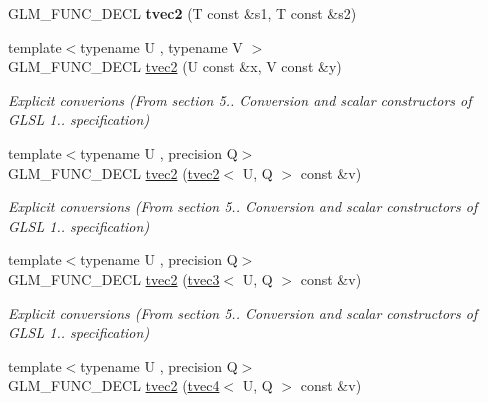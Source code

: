 \begin{DoxyCompactItemize}
\item 
G\+L\+M\+\_\+\+F\+U\+N\+C\+\_\+\+D\+E\+CL {\bfseries tvec2} (T const \&s1, T const \&s2)\hypertarget{structglm_1_1detail_1_1tvec2_a1c01dd00c55f77aae7bbb7e33ca85c54}{}\label{structglm_1_1detail_1_1tvec2_a1c01dd00c55f77aae7bbb7e33ca85c54}

\item 
{\footnotesize template$<$typename U , typename V $>$ }\\G\+L\+M\+\_\+\+F\+U\+N\+C\+\_\+\+D\+E\+CL \hyperlink{structglm_1_1detail_1_1tvec2_a7521b4e5e4260e7e53f936b01b18e3c7}{tvec2} (U const \&x, V const \&y)\hypertarget{structglm_1_1detail_1_1tvec2_a7521b4e5e4260e7e53f936b01b18e3c7}{}\label{structglm_1_1detail_1_1tvec2_a7521b4e5e4260e7e53f936b01b18e3c7}

\begin{DoxyCompactList}\small\item\em Explicit converions (From section 5.. Conversion and scalar constructors of G\+L\+SL 1.. specification) \end{DoxyCompactList}\item 
{\footnotesize template$<$typename U , precision Q$>$ }\\G\+L\+M\+\_\+\+F\+U\+N\+C\+\_\+\+D\+E\+CL \hyperlink{structglm_1_1detail_1_1tvec2_aac611127f03f3948bacb14b063fa3aca}{tvec2} (\hyperlink{structglm_1_1detail_1_1tvec2}{tvec2}$<$ U, Q $>$ const \&v)\hypertarget{structglm_1_1detail_1_1tvec2_aac611127f03f3948bacb14b063fa3aca}{}\label{structglm_1_1detail_1_1tvec2_aac611127f03f3948bacb14b063fa3aca}

\begin{DoxyCompactList}\small\item\em Explicit conversions (From section 5.. Conversion and scalar constructors of G\+L\+SL 1.. specification) \end{DoxyCompactList}\item 
{\footnotesize template$<$typename U , precision Q$>$ }\\G\+L\+M\+\_\+\+F\+U\+N\+C\+\_\+\+D\+E\+CL \hyperlink{structglm_1_1detail_1_1tvec2_a79d0d9907539559a9c5cea20a57ad669}{tvec2} (\hyperlink{structglm_1_1detail_1_1tvec3}{tvec3}$<$ U, Q $>$ const \&v)\hypertarget{structglm_1_1detail_1_1tvec2_a79d0d9907539559a9c5cea20a57ad669}{}\label{structglm_1_1detail_1_1tvec2_a79d0d9907539559a9c5cea20a57ad669}

\begin{DoxyCompactList}\small\item\em Explicit conversions (From section 5.. Conversion and scalar constructors of G\+L\+SL 1.. specification) \end{DoxyCompactList}\item 
{\footnotesize template$<$typename U , precision Q$>$ }\\G\+L\+M\+\_\+\+F\+U\+N\+C\+\_\+\+D\+E\+CL \hyperlink{structglm_1_1detail_1_1tvec2_a5a2a0de134fd7f21ba208978968611b8}{tvec2} (\hyperlink{structglm_1_1detail_1_1tvec4}{tvec4}$<$ U, Q $>$ const \&v)\hypertarget{structglm_1_1detail_1_1tvec2_a5a2a0de134fd7f21ba208978968611b8}{}\label{structglm_1_1detail_1_1tvec2_a5a2a0de134fd7f21ba208978968611b8}


\end{DoxyCompactItemize}
